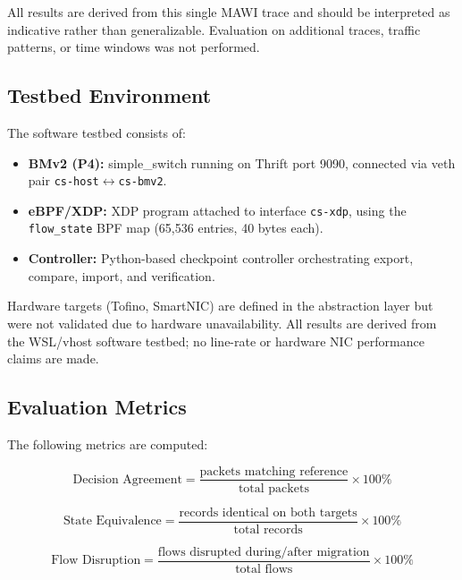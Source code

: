 \documentclass[10pt, conference]{IEEEtran}
\begin{document}
All results are derived from this single MAWI trace and should be interpreted as indicative rather than generalizable. Evaluation on additional traces, traffic patterns, or time windows was not performed.

\subsection{Testbed Environment}
\label{subsec:testbed}
The software testbed consists of:
\begin{itemize}
    \item \textbf{BMv2 (P4):} simple\_switch running on Thrift port 9090, connected via veth pair \texttt{cs-host}$\leftrightarrow$\texttt{cs-bmv2}.
    \item \textbf{eBPF/XDP:} XDP program attached to interface \texttt{cs-xdp}, using the \texttt{flow\_state} BPF map (65{,}536 entries, 40 bytes each).
    \item \textbf{Controller:} Python-based checkpoint controller orchestrating export, compare, import, and verification.
\end{itemize}

Hardware targets (Tofino, SmartNIC) are defined in the abstraction layer but were not validated due to hardware unavailability. All results are derived from the WSL/vhost software testbed; no line-rate or hardware NIC performance claims are made.

\subsection{Evaluation Metrics}
\label{subsec:metrics}
The following metrics are computed:

\begin{equation}
    \text{Decision Agreement} =
    \frac{\text{packets matching reference}}{\text{total packets}} \times 100\%
\label{eq:decision_agreement}
\end{equation}

\begin{equation}
    \text{State Equivalence} =
    \frac{\text{records identical on both targets}}{\text{total records}}
    \times 100\%
\label{eq:state_equivalence}
\end{equation}

\begin{equation}
    \text{Flow Disruption} =
    \frac{\text{flows disrupted during/after migration}}{\text{total flows}}
    \times 100\%
\label{eq:flow_disruption}
\end{equation}
\end{document}
